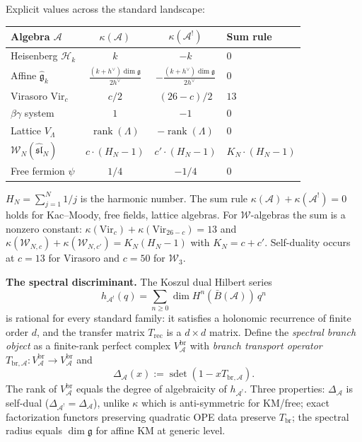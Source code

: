 \documentclass[11pt]{report}
\theoremstyle{definition}
\theoremstyle{remark}
\providecommand{\cA}{\mathcal{A}}
\providecommand{\cH}{\mathcal{H}}
\providecommand{\barB}{\bar{B}}
\providecommand{\fg}{\mathfrak{g}}
\numberwithin{equation}{section}
\begin{document}
Explicit values across the standard landscape:
\begin{center}
\renewcommand{\arraystretch}{1.2}
\begin{tabular}{lccl}
\textbf{Algebra $\cA$} & $\kappa(\cA)$ & $\kappa(\cA^!)$ & \textbf{Sum rule}\\
\hline
Heisenberg $\cH_k$ & $k$ & $-k$ & $0$\\[1pt]
Affine $\widehat{\fg}_k$ & $\tfrac{(k+h^\vee)\dim\fg}{2h^\vee}$ & $-\tfrac{(k+h^\vee)\dim\fg}{2h^\vee}$ & $0$\\[4pt]
Virasoro $\mathrm{Vir}_c$ & $c/2$ & $(26-c)/2$ & $13$\\[1pt]
$\beta\gamma$ system & $1$ & $-1$ & $0$\\[1pt]
Lattice $V_\Lambda$ & $\operatorname{rank}(\Lambda)$ & $-\operatorname{rank}(\Lambda)$ & $0$\\[1pt]
$\mathcal W_N(\widehat{\mathfrak{sl}}_N)$ & $c\cdot(H_N-1)$ & $c'\cdot(H_N-1)$ & $K_N\cdot(H_N-1)$\\[4pt]
Free fermion $\psi$ & $1/4$ & $-1/4$ & $0$
\end{tabular}
\end{center}
$H_N=\sum_{j=1}^N 1/j$ is the harmonic number. The sum rule
$\kappa(\cA)+\kappa(\cA^!)=0$ holds for Kac--Moody, free fields,
lattice algebras. For $\mathcal W$-algebras the sum is a nonzero
constant: $\kappa(\mathrm{Vir}_c)+\kappa(\mathrm{Vir}_{26-c})=13$ and
$\kappa(\mathcal W_{N,c})+\kappa(\mathcal W_{N,c'})=K_N(H_N-1)$ with
$K_N=c+c'$. Self-duality occurs at $c=13$ for Virasoro and $c=50$
for $\mathcal W_3$.

\medskip
\noindent\textbf{The spectral discriminant.}\enspace
The Koszul dual Hilbert series
\[
h_{\cA^!}(q)=\sum_{n\ge 0}\dim H^n(\barB(\cA))\,q^n
\]
is rational for every standard family: it satisfies a holonomic
recurrence of finite order $d$, and the transfer matrix
$T_{\mathrm{rec}}$ is a $d\times d$ matrix. Define the
\emph{spectral branch object} as a finite-rank perfect complex
$V^{\mathrm{br}}_\cA$ with \emph{branch transport operator}
$T_{\mathrm{br},\cA}\colon V^{\mathrm{br}}_\cA\to V^{\mathrm{br}}_\cA$
and
\begin{equation}\label{eq:pref-delta-def}
\Delta_\cA(x):=\operatorname{sdet}(1-xT_{\mathrm{br},\cA}).
\end{equation}
The rank of $V^{\mathrm{br}}_\cA$ equals the degree of algebraicity of
$h_{\cA^!}$. Three properties: $\Delta_\cA$ is self-dual
($\Delta_{\cA^!}=\Delta_\cA$), unlike $\kappa$ which is anti-symmetric
for KM/free; exact factorization functors preserving quadratic OPE
data preserve $T_{\mathrm{br}}$; the spectral radius equals
$\dim\mathfrak g$ for affine KM at generic level.
\end{document}
